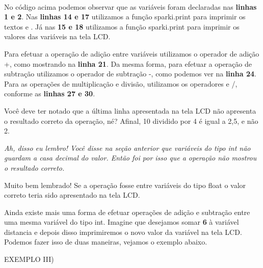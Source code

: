 \documentclass[conference]{IEEEtran}
\begin{document}
    \\
    \par 
    No código acima podemos observar que as variáveis foram declaradas nas \textbf{linhas 1 e 2}. Nas \textbf{linhas 14 e 17} utilizamos a função sparki.print para imprimir os textos {} e {}. Já nas \textbf{15 e 18} utilizamos a função sparki.print para imprimir os valores das variáveis na tela LCD.
    \par
    Para efetuar a operação de adição entre variáveis utilizamos o operador de adição {\selectfont +}, como mostrando na {\textbf{linha 21}}. Da mesma forma, para efetuar a operação de subtração utilizamos o operador de subtração {\selectfont -}, como podemos ver na {\textbf{linha 24}}. Para as operações de multiplicação e divisão, utilizamos os operadores {\selectfont *} e {\selectfont /}, conforme as {\textbf{linhas 27 e 30}}.
    \par
    Você deve ter notado que a última linha apresentada na tela LCD não apresenta o resultado correto da operação, né? Afinal, 10 dividido por 4 é igual a 2,5, e não 2.
    \par
    \textit{Ah, disso eu lembro! Você disse na seção anterior que variáveis do tipo {\selectfont\color{blue}int} não guardam a casa decimal do valor. Então foi por isso que a operação não mostrou o resultado correto.} 
    \par
    Muito bem lembrado! Se a operação fosse entre variáveis do tipo {\selectfont\color{blue}float} o valor correto teria sido apresentado na tela LCD.
    \par
    Ainda existe mais uma forma de efetuar operações de adição e subtração entre uma mesma variável do tipo {\selectfont\color{blue}int}. Imagine que desejamos somar \textbf{6} à variável {\selectfont distancia} e depois disso imprimiremos o novo valor da variável na tela LCD. Podemos fazer isso de duas maneiras, vejamos o exemplo abaixo.
    \begin{center}
        EXEMPLO III)
    \end{center}
\end{document}
